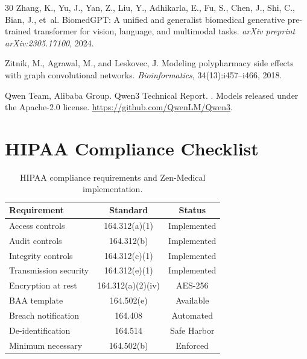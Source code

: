 \documentclass[11pt,a4paper]{article}
\begin{document}
\begin{thebibliography}{30}
Zhang, K., Yu, J., Yan, Z., Liu, Y., Adhikarla, E., Fu, S., Chen, J., Shi, C., Bian, J., et~al.
\newblock BiomedGPT: A unified and generalist biomedical generative pre-trained transformer for vision, language, and multimodal tasks.
\newblock \emph{arXiv preprint arXiv:2305.17100}, 2024.

Zitnik, M., Agrawal, M., and Leskovec, J.
\newblock Modeling polypharmacy side effects with graph convolutional networks.
\newblock \emph{Bioinformatics}, 34(13):i457--i466, 2018.

Qwen Team, Alibaba Group.
\newblock Qwen3 Technical Report.
. Models released under the Apache-2.0 license. \url{https://github.com/QwenLM/Qwen3}.

\end{thebibliography}

\appendix

\section{HIPAA Compliance Checklist}
\label{app:hipaa}

\begin{table}[h]
\centering
\caption{HIPAA compliance requirements and Zen-Medical implementation.}
\label{tab:hipaa}
\begin{tabular}{lcc}
\toprule
\textbf{Requirement} & \textbf{Standard} & \textbf{Status} \\
\midrule
Access controls & 164.312(a)(1) & Implemented \\
Audit controls & 164.312(b) & Implemented \\
Integrity controls & 164.312(c)(1) & Implemented \\
Transmission security & 164.312(e)(1) & Implemented \\
Encryption at rest & 164.312(a)(2)(iv) & AES-256 \\
BAA template & 164.502(e) & Available \\
Breach notification & 164.408 & Automated \\
De-identification & 164.514 & Safe Harbor \\
Minimum necessary & 164.502(b) & Enforced \\
\bottomrule
\end{tabular}
\end{table}
\end{document}
